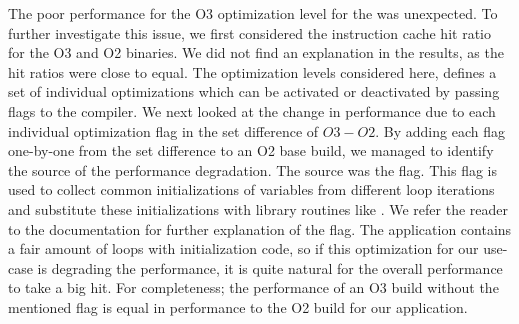 The poor performance for the O3 optimization level for the {\C} was unexpected.
To further investigate this issue, we first considered the instruction cache hit ratio for the O3 and O2 binaries.
We did not find an explanation in the results, as the hit ratios were close to equal.
The optimization levels considered here, defines a set of individual optimizations which can be activated or deactivated by passing flags to the compiler.
We next looked at the change in performance due to each individual optimization flag in the set difference of $O3-O2$.
By adding each flag one-by-one from the set difference to an O2 base build, we managed to identify the source of the performance degradation.
The source was the  flag.
This flag is used to collect common initializations of variables from different loop iterations and substitute these initializations with library routines like .
We refer the reader to the  documentation for further explanation of the flag.
The {\cg} application contains a fair amount of loops with initialization code, so if this optimization for our use-case is degrading the performance, it is quite natural for the overall performance to take a big hit.
For completeness; the performance of an O3 build without the mentioned flag is equal in performance to the O2 build for our application.



